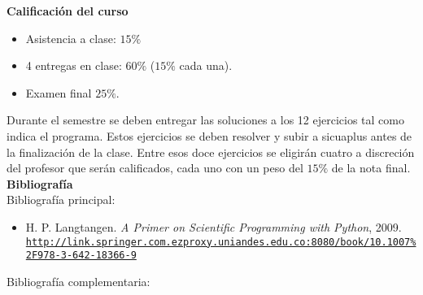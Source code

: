 \documentclass[letterpaper,10pt,onecolumn]{article}
\begin{document}
\noindent\textbf{\large {} \quad Calificaci\'on del curso}\\[-0.2cm]

\begin{itemize}
        \item Asistencia a clase: $15\%$
	\item 4 entregas en clase: $60\%$ ($15\%$ cada una).
	\item Examen final $25\%$.
\end{itemize}
\noindent\normalsize Durante el semestre se deben entregar 
las soluciones a los 12 ejercicios tal como indica el programa. 
Estos ejercicios se deben resolver y subir a sicuaplus antes de la
finalizaci\'on de la clase. 
Entre esos doce ejercicios se 
eligirán cuatro a discreci\'on del profesor que serán calificados, cada uno con un peso del $15\%$ de la nota final. 
\\[0.1cm] 

\noindent\textbf{\large {} \quad Bibliografía}\\[-0.2cm]

\noindent\normalsize Bibliografía principal:


\begin{itemize}
	\item H. P. Langtangen. \textit{A Primer on Scientific Programming with Python}, 2009.\\
	\href{http://link.springer.com.ezproxy.uniandes.edu.co:8080/book/10.1007\%2F978-3-642-18366-9}{\nolinkurl{http://link.springer.com.ezproxy.uniandes.edu.co:8080/book/10.1007\%2F978-3-642-18366-9}}\\[-0.6cm]
\end{itemize}

\noindent\normalsize Bibliografía complementaria:
\end{document}
